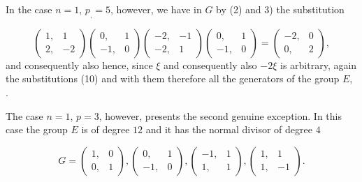 
In the case $n=1$, $p_{,}=5$, however, we have in $G$ by (2) %
and 3) the substitution

\[
\begin{pmatrix} 1, & 1 \\ 2, & -2 \end{pmatrix}
\begin{pmatrix} 0, & 1 \\ -1, & 0 \end{pmatrix}
\begin{pmatrix} -2, & -1 \\ -2, & 1 \end{pmatrix}
\begin{pmatrix} 0, & 1 \\ -1, & 0 \end{pmatrix}
=
\begin{pmatrix} -2, & 0 \\ 0, & 2 \end{pmatrix},
\]
and consequently also
hence, since $\xi$ and consequently also $-2\xi$ is arbitrary, again the substitutions (10) and with them therefore all the generators of the group $E$,
.

The case $n=1$, $p=3$, however, presents the second genuine
exception. In this case the group $E$ is of degree $12$
and it has the normal divisor of degree $4$

\[
G =
\begin{pmatrix} 1, & 0 \\ 0, & 1 \end{pmatrix},
\begin{pmatrix} 0, & 1 \\ -1, & 0 \end{pmatrix},
\begin{pmatrix} -1, & 1 \\ 1, & 1 \end{pmatrix},
\begin{pmatrix} 1, & 1 \\ 1, & -1 \end{pmatrix}.
\]


